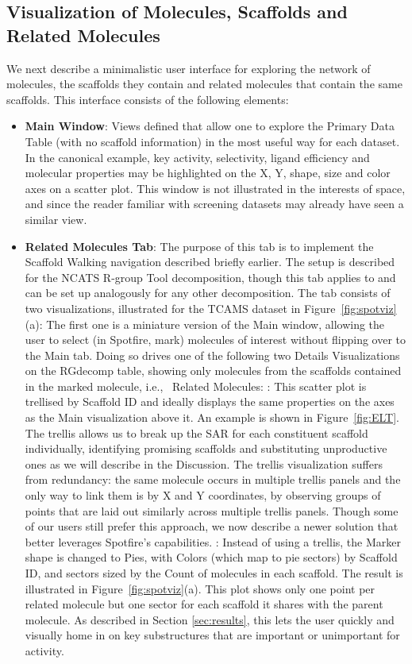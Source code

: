 \documentclass[journal=jacsat,manuscript=article]{achemso}
\newcommand*\fref[1]{Figure~\ref{fig:#1}}
\newcommand*\ie{i.e.,~}
\begin{document}
\subsection{Visualization of Molecules, Scaffolds and Related Molecules}

We next describe a minimalistic user interface for exploring the
network of molecules, the scaffolds they contain and related molecules
that contain the same scaffolds. This interface consists of the
following elements:
\begin{itemize}
\item {\bf Main Window}: Views defined that allow one to explore the
  Primary Data Table (with no scaffold information) in the most useful
  way for each dataset.  In the canonical example, key activity,
  selectivity, ligand efficiency and molecular properties may be
  highlighted on the X, Y, shape, size and color axes on a scatter
  plot. This window is not illustrated in the interests of space, and
  since the reader familiar with screening datasets may already have seen a similar view.
\item {\bf Related Molecules Tab}: The purpose of this tab is to
  implement the Scaffold Walking navigation described briefly earlier.
  The setup is described for the NCATS R-group Tool decomposition,
  though this tab applies to and can be set up analogously for any
  other decomposition. The tab consists of two visualizations,
  illustrated for the TCAMS dataset in \fref{spotviz}(a): \subitem The
  first one is a miniature version of the Main window, allowing the
  user to select (in Spotfire, mark) molecules of interest without
  flipping over to the Main tab. Doing so drives one of the following
  two Details Visualizations on the {RG}decomp table, showing only
  molecules from the scaffolds contained in the marked molecule, \ie
  Related Molecules: : This scatter
  plot is trellised by Scaffold ID and ideally displays the same
  properties on the axes as the Main visualization above it.  An
  example is shown in \fref{ELT}. The trellis allows us to break up
  the SAR for each constituent scaffold individually, identifying
  promising scaffolds and substituting unproductive ones as we will
  describe in the Discussion. The trellis visualization suffers from
  redundancy: the same molecule occurs in multiple trellis panels and
  the only way to link them is by X and Y coordinates, by observing
  groups of points that are laid out similarly across multiple trellis
  panels.  Though some of our users still prefer this approach, we now
  describe a newer solution that better leverages Spotfire's
  capabilities.  : Instead of using a
  trellis, the Marker shape is changed to Pies, with Colors (which map
  to pie sectors) by Scaffold ID, and sectors sized by the Count of
  molecules in each scaffold.  The result is illustrated in
  \fref{spotviz}(a). This plot shows only one point per related
  molecule but one sector for each scaffold it shares with the parent
  molecule.  As described in Section \ref{sec:results}, this lets the
  user quickly and visually home in on key substructures that are
  important or unimportant for activity.


\end{itemize}
\end{document}
